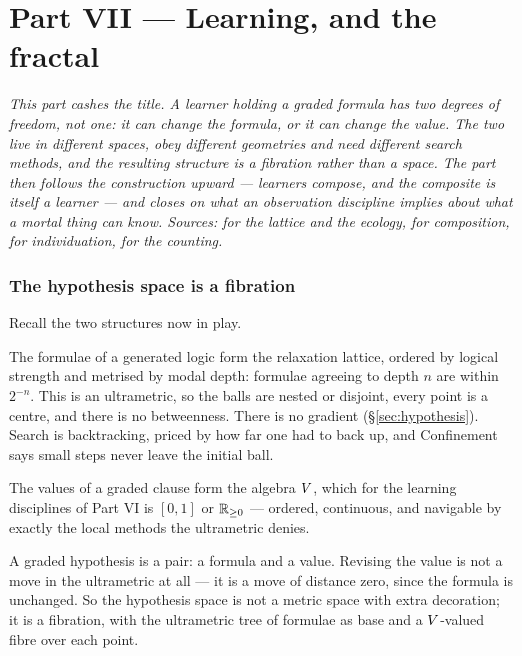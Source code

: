 \part*{Part VII --- Learning, and the fractal}

\bigskip
\noindent
\emph{This part cashes the title. A learner holding a graded formula has two
degrees of freedom, not one: it can change the formula, or it can change the
value. The two live in different spaces, obey different geometries and need
different search methods, and the resulting structure is a fibration rather than a
space. The part then follows the construction upward --- learners compose, and the
composite is itself a learner --- and closes on what an observation discipline
implies about what a mortal thing can know. Sources: \cite{ScientistNote} for the
lattice and the ecology, \cite{ComposeNote} for composition,
\cite{EngineNote} for individuation, \cite{ScopeNote} for the counting.}
\bigskip

\section{The hypothesis space is a fibration}
\label{sec:fibration}

Recall the two structures now in play.

The formulae of a generated logic form the relaxation lattice, ordered by logical
strength and metrised by modal depth: formulae agreeing to depth $n$ are within
$2^{-n}$. This is an ultrametric, so the balls are nested or disjoint, every point
is a centre, and there is no betweenness. There is no gradient
(\S\ref{sec:hypothesis}). Search is backtracking, priced by how far one had to
back up, and Confinement says small steps never leave the initial ball.

The values of a graded clause form the algebra $V$, which for the learning
disciplines of Part VI is $[0,1]$ or $\mathbb{R}_{\ge0}$ --- ordered, continuous, and
navigable by exactly the local methods the ultrametric denies.

\begin{observation}
\label{obs:twodof}
A graded hypothesis is a pair: a formula and a value. Revising the value is not a
move in the ultrametric at all --- it is a move of distance zero, since the formula
is unchanged. So the hypothesis space is not a metric space with extra decoration;
it is a fibration, with the ultrametric tree of formulae as base and a
$V$-valued fibre over each point.
\end{observation}

